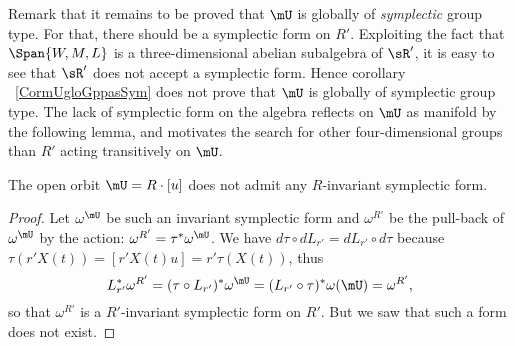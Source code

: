 Remark  that it remains to be proved that $\mU$ is globally of \emph{symplectic} group type. For that, there should be a symplectic form on $R'$. Exploiting the fact that $\Span\{W,M,L \}$ is a three-dimensional abelian subalgebra of $\sR'$, it is easy to see that $\sR'$ does not accept a symplectic form. Hence  corollary ~\ref{CormUgloGppasSym} does not prove that $\mU$ is globally of symplectic group type. The lack of symplectic form on the algebra reflects on $\mU$ as manifold by the following lemma, and motivates the search for other four-dimensional groups than $R'$ acting transitively on $\mU$.

\begin{lemma}
The open orbit $\mU=R\cdot [u]$ does not admit any $R$-invariant symplectic form.
\end{lemma}

\begin{proof}
Let $\omega^{\mU}$ be such an invariant symplectic form and $\omega^{R'}$ be the pull-back of $\omega^{\mU}$ by the action: $\omega^{R'}=\tau^*\omega^{\mU}$.
We have $d\tau\circ dL_{r'}=dL_{r'}\circ d\tau$ because $\tau(r'X(t))=[r'X(t)u]=r'\tau(X(t))$, thus
\[
  L_{r'}^*\omega^{R'}=(\tau\circ L_{r'})^*\omega^{\mU}=(L_{r'}\circ\tau)^*\omega(\mU)=\omega^{R'},
\]
so that $\omega^{R'}$ is a $R'$-invariant symplectic form on $R'$. But we saw that such a form does not exist.
\end{proof}

